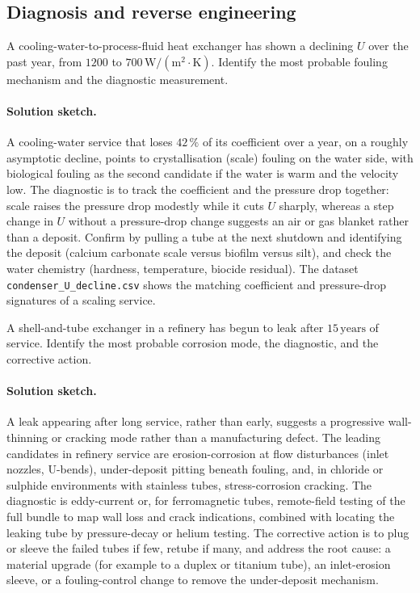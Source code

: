 \subsection*{Diagnosis and reverse engineering}

\begin{exercise}
A cooling-water-to-process-fluid heat exchanger has shown a
declining $U$ over the past year, from $1200$ to $700\,\text{W}/(
\text{m}^2\cdot\si{\kelvin})$. Identify the most probable fouling
mechanism and the diagnostic measurement.

\paragraph{Solution sketch.} A cooling-water service that loses $42\,\%$
of its coefficient over a year, on a roughly asymptotic decline, points
to crystallisation (scale) fouling on the water side, with biological
fouling as the second candidate if the water is warm and the velocity
low. The diagnostic is to track the coefficient and the pressure drop
together: scale raises the pressure drop modestly while it cuts $U$
sharply, whereas a step change in $U$ without a pressure-drop change
suggests an air or gas blanket rather than a deposit. Confirm by pulling
a tube at the next shutdown and identifying the deposit (calcium
carbonate scale versus biofilm versus silt), and check the water
chemistry (hardness, temperature, biocide residual). The dataset
\texttt{condenser\_U\_decline.csv} shows the matching coefficient and
pressure-drop signatures of a scaling service.
\end{exercise}

\begin{exercise}
A shell-and-tube exchanger in a refinery has begun to leak after
$15\,\text{years}$ of service. Identify the most probable corrosion
mode, the diagnostic, and the corrective action.

\paragraph{Solution sketch.} A leak appearing after long service, rather
than early, suggests a progressive wall-thinning or cracking mode
rather than a manufacturing defect. The leading candidates in refinery
service are erosion-corrosion at flow disturbances (inlet nozzles,
U-bends), under-deposit pitting beneath fouling, and, in chloride or
sulphide environments with stainless tubes, stress-corrosion cracking.
The diagnostic is eddy-current or, for ferromagnetic tubes,
remote-field testing of the full bundle to map wall loss and crack
indications, combined with locating the leaking tube by pressure-decay
or helium testing. The corrective action is to plug or sleeve the failed
tubes if few, retube if many, and address the root cause: a material
upgrade (for example to a duplex or titanium tube), an inlet-erosion
sleeve, or a fouling-control change to remove the under-deposit
mechanism.
\end{exercise}

